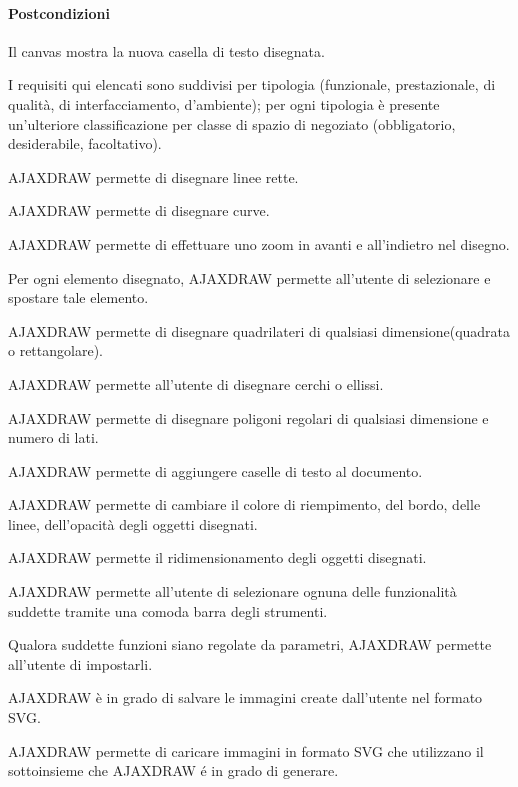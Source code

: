\paragraph{Postcondizioni} Il canvas mostra la nuova casella di testo disegnata.


\label{listarequisiti}
I requisiti qui elencati sono suddivisi per tipologia (funzionale, prestazionale, di qualit\`a, di interfacciamento, d'ambiente); 
per ogni tipologia \`e presente un'ulteriore classificazione per classe di spazio di negoziato (obbligatorio, desiderabile, facoltativo). 
\begin{elenconumerato}{\subsubsecindent}
\item{AJAXDRAW permette di disegnare linee rette.}
\item{AJAXDRAW permette di disegnare curve.}
\item{AJAXDRAW permette di effettuare uno zoom in avanti e all'indietro nel disegno.}
\item{Per ogni elemento disegnato, AJAXDRAW permette all'utente di selezionare e spostare tale elemento.}
\item{AJAXDRAW permette di disegnare quadrilateri di qualsiasi dimensione(quadrata o rettangolare).}
\item{AJAXDRAW permette all'utente di disegnare cerchi o ellissi.}
\item{AJAXDRAW permette di disegnare poligoni regolari di qualsiasi dimensione e numero di lati.}
\item{AJAXDRAW permette di aggiungere caselle di testo al documento. }
\item{AJAXDRAW permette di cambiare il colore di riempimento, del bordo, delle linee, dell'opacità degli oggetti disegnati.}
\item{AJAXDRAW permette il ridimensionamento degli oggetti disegnati.}
\item{AJAXDRAW permette all'utente di selezionare ognuna delle funzionalit\`a suddette tramite una comoda barra degli strumenti.}
\item{Qualora suddette funzioni siano regolate da parametri, AJAXDRAW permette all'utente di impostarli.}
\item{AJAXDRAW \`e in grado di salvare le immagini create dall'utente nel formato SVG.}
\item{AJAXDRAW permette di caricare immagini in formato SVG che utilizzano il sottoinsieme che AJAXDRAW \'e in grado di generare.}
\end{elenconumerato}

